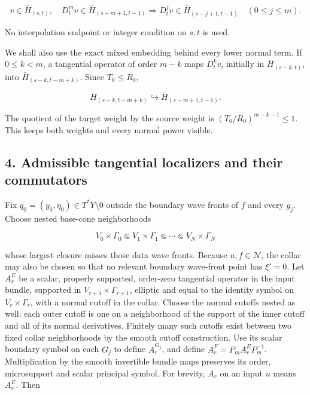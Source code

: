 \documentclass[
  11pt,
]{article}
\makeatletter
\let\ReaderOriginalAnchorStart\hyper@anchorstart
\let\ReaderOriginalAnchorEnd\hyper@anchorend
\let\ReaderPendingAliases\@empty
\def\ReaderArmAliases#1{\gdef\ReaderPendingAliases{#1}}
\def\hyper@anchorstart#1{\ReaderIfNativeAnchorTF{#1}{\ReaderPendingAliases\global\let\ReaderPendingAliases\@empty}{}\ReaderOriginalAnchorStart{#1}}
\makeatother
\begin{document}
\[
 v\in\bar H_{(s,t)},\quad
 D_t^mv\in\bar H_{(s-m+1,t-1)}
 \Longrightarrow
 D_t^jv\in\bar H_{(s-j+1,t-1)}
 \quad(0\leq j\leq m).
 \tag{BW10}
\]

No interpolation endpoint or integer condition on \(s,t\) is used.

We shall also use the exact mixed embedding behind every lower normal
term. If \(0\leq k<m\), a tangential operator of order \(m-k\) maps
\(D_t^kv\), initially in \(\bar H_{(s-k,t)}\), into
\(\bar H_{(s-k,t-m+k)}\). Since \(T_0\leq R_0\),

\[
 \bar H_{(s-k,t-m+k)}
 \hookrightarrow\bar H_{(s-m+1,t-1)}.
 \tag{BW11}
\]

The quotient of the target weight by the source weight is
\((T_0/R_0)^{m-k-1}\leq1\). This keeps both weights and every normal
power visible.

\ReaderArmAliases{\ReaderOriginalAnchorStart{AN03-BWF-004}\ReaderOriginalAnchorEnd\begingroup\expandafter\def\csname @currentHref\endcsname{AN03-BWF-004}\label{AN03-BWF-004}\endgroup\ReaderOriginalAnchorStart{4-admissible-tangential-localizers-and-their-commutators}\ReaderOriginalAnchorEnd\begingroup\expandafter\def\csname @currentHref\endcsname{4-admissible-tangential-localizers-and-their-commutators}\label{4-admissible-tangential-localizers-and-their-commutators}\endgroup}
\subsection{4. Admissible tangential localizers and their
commutators}\label{admissible-tangential-localizers-and-their-commutators}

Fix \(q_0=(y_0,\eta_0)\in T^*Y\setminus0\) outside the boundary wave
fronts of \(f\) and every \(g_j\). Choose nested base-cone neighborhoods

\[
 V_0\times\Gamma_0\Subset V_1\times\Gamma_1
 \Subset\cdots\Subset V_N\times\Gamma_N
 \tag{BW12}
\]

whose largest closure misses those data wave fronts. Because
\(u,f\in\mathcal N\), the collar may also be chosen so that no relevant
boundary wave-front point has \(\xi'=0\). Let \(A_r^E\) be a scalar,
properly supported, order-zero tangential operator in the input bundle,
supported in \(V_{r+1}\times\Gamma_{r+1}\), elliptic and equal to the
identity symbol on \(V_r\times\Gamma_r\), with a normal cutoff in the
collar. Choose the normal cutoffs nested as well: each outer cutoff is
one on a neighborhood of the support of the inner cutoff and all of its
normal derivatives. Finitely many such cutoffs exist between two fixed
collar neighborhoods by the smooth cutoff construction. Use its scalar
boundary symbol on each \(G_j\) to define \(A_r^{G_j}\), and define
\(A_r^F=P_mA_r^EP_m^{-1}\). Multiplication by the smooth invertible
bundle maps preserves its order, microsupport and scalar principal
symbol. For brevity, \(A_r\) on an input \(u\) means \(A_r^E\). Then
\end{document}
